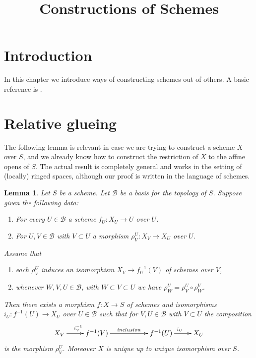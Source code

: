 \documentclass{stacks-project}
\theoremstyle{plain}
\newtheorem{lemma}[subsection]{Lemma}
\theoremstyle{definition}
\theoremstyle{remark}
\numberwithin{equation}{subsection}
\begin{document}
\title{Constructions of Schemes}


\maketitle

\label{section-phantom}

\tableofcontents

\section{Introduction}
\label{section-introduction}

\noindent
In this chapter we introduce ways of constructing schemes out of others.
A basic reference is \cite{EGA}.





\section{Relative glueing}
\label{section-relative-glueing}

\noindent
The following lemma is relevant in case we are trying to construct a
scheme $X$ over $S$, and we already know how to construct the restriction
of $X$ to the affine opens of $S$. The actual result is completely general
and works in the setting of (locally) ringed spaces, although our proof
is written in the language of schemes.

\begin{lemma}
\label{lemma-relative-glueing}
Let $S$ be a scheme.
Let $\mathcal{B}$ be a basis for the topology of $S$.
Suppose given the following data:
\begin{enumerate}
\item For every $U \in \mathcal{B}$ a scheme $f_U : X_U \to U$ over $U$.
\item For $U, V \in \mathcal{B}$ with $V \subset U$ a morphism
$\rho^U_V : X_V \to X_U$ over $U$.
\end{enumerate}
Assume that
\begin{enumerate}
\item[(a)] each $\rho^U_V$ induces an isomorphism
$X_V \to f_U^{-1}(V)$ of schemes over $V$,
\item[(b)] whenever $W, V, U \in \mathcal{B}$, with
$W \subset V \subset U$ we have $\rho^U_W = \rho^U_V \circ \rho ^V_W$.
\end{enumerate}
Then there exists a morphism $f : X \to S$ of schemes
and isomorphisms $i_U : f^{-1}(U) \to X_U$ over $U \in \mathcal{B}$
such that for $V, U \in \mathcal{B}$ with $V \subset U$ the composition
$$
\xymatrix{
X_V \ar[r]^{i_V^{-1}} &
f^{-1}(V) \ar[rr]^{inclusion} & &
f^{-1}(U) \ar[r]^{i_U} &
X_U
}
$$
is the morphism $\rho^U_V$. Moreover $X$ is unique up to
unique isomorphism over $S$.
\end{lemma}
\end{document}
